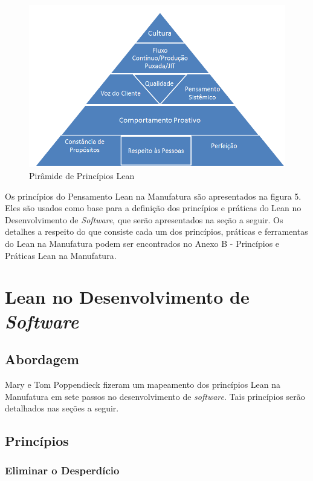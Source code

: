\begin{figure}[H]
		\centering
		\label{fig02}
			\includegraphics[scale=0.7]{figuras/principioslean.png}
		\caption{Pirâmide de Princípios Lean}
\end{figure}

Os princípios do Pensamento Lean na Manufatura são apresentados na figura 5. Eles são usados como base para a definição dos princípios e práticas do Lean no Desenvolvimento de \textit{Software}, que serão apresentados na seção a seguir. Os detalhes a respeito do que consiste cada um dos princípios, práticas e ferramentas do Lean na Manufatura podem ser encontrados no Anexo B - Princípios e Práticas Lean na Manufatura.

\section[Lean no Desenvolvimento de \textit{Software}]{Lean no Desenvolvimento de \textit{ Software}}

\subsection[Abordagem]{Abordagem}

Mary e Tom Poppendieck fizeram um mapeamento dos princípios Lean na Manufatura em sete passos no desenvolvimento de \textit{software}. Tais princípios serão detalhados nas seções a seguir. 

\subsection[Princípios]{Princípios}

\subsubsection[Eliminar o Desperdício]{Eliminar o Desperdício}

